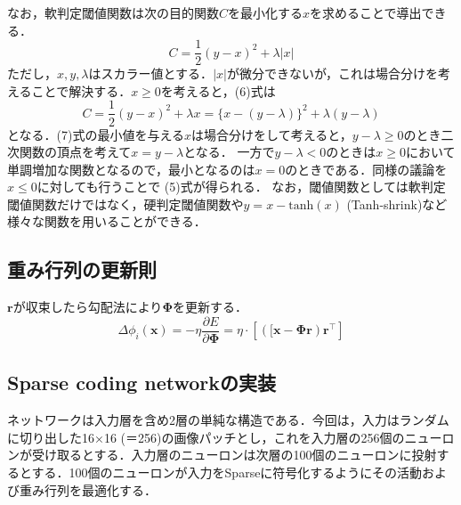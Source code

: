 なお，軟判定閾値関数は次の目的関数$C$を最小化する$x$を求めることで導出できる．
\begin{equation}
C=\frac{1}{2}(y-x)^2+\lambda |x|
\end{equation}
ただし，$x, y, \lambda$はスカラー値とする．$|x|$が微分できないが，これは場合分けを考えることで解決する．$x\geq 0$を考えると，(6)式は
\begin{equation}
C=\frac{1}{2}(y-x)^2+\lambda x = \{x-(y-\lambda)\}^2+\lambda(y-\lambda)
\end{equation}
となる．(7)式の最小値を与える$x$は場合分けをして考えると，$y-\lambda\geq0$のとき二次関数の頂点を考えて$x=y-\lambda$となる． 一方で$y-\lambda<0$のときは$x\geq0$において単調増加な関数となるので，最小となるのは$x=0$のときである．同様の議論を$x\leq0$に対しても行うことで (5)式が得られる．
なお，閾値関数としては軟判定閾値関数だけではなく，硬判定閾値関数や$y=x - \text{tanh}(x)$ (Tanh-shrink)など様々な関数を用いることができる．
\subsection{重み行列の更新則}
$\mathbf{r}$が収束したら勾配法により$\mathbf{\Phi}$を更新する．
\begin{equation}
\Delta \phi_i(\boldsymbol{x}) = -\eta \frac{\partial E}{\partial \mathbf{\Phi}}=\eta\cdot\left[\left([\mathbf{x}-\mathbf{\Phi}\mathbf{r}\right)\mathbf{r}^\top\right]
\end{equation}
\subsection{Sparse coding networkの実装}
ネットワークは入力層を含め2層の単純な構造である．今回は，入力はランダムに切り出した16×16 (＝256)の画像パッチとし，これを入力層の256個のニューロンが受け取るとする．入力層のニューロンは次層の100個のニューロンに投射するとする．100個のニューロンが入力をSparseに符号化するようにその活動および重み行列を最適化する．
